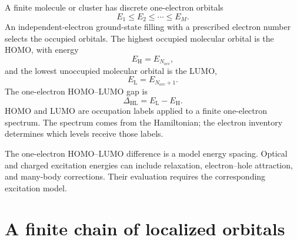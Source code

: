 A finite molecule or cluster has discrete one-electron orbitals
\begin{equation}
  E_1\le E_2\le\cdots\le E_M.
  \label{eq:finite-molecular-orbital-ordering}
\end{equation}
An independent-electron ground-state filling with a prescribed electron number
selects the occupied orbitals.  The highest occupied molecular orbital is the
HOMO, with energy
\begin{equation}
  E_{\mathrm H}=E_{N_{\mathrm{occ}}},
  \label{eq:homo-energy-definition}
\end{equation}
and the lowest unoccupied molecular orbital is the LUMO,
\begin{equation}
  E_{\mathrm L}=E_{N_{\mathrm{occ}}+1}.
  \label{eq:lumo-energy-definition}
\end{equation}
The one-electron HOMO--LUMO gap is
\begin{equation}
  \boxed{
  \Delta_{\mathrm{HL}}=E_{\mathrm L}-E_{\mathrm H}.
  }
  \label{eq:homo-lumo-gap}
\end{equation}
HOMO and LUMO are occupation labels applied to a finite one-electron spectrum.
The spectrum comes from the Hamiltonian; the electron inventory determines
which levels receive those labels.

The one-electron HOMO--LUMO difference is a model energy spacing.  Optical and
charged excitation energies can include relaxation, electron--hole attraction,
and many-body corrections.  Their evaluation requires the corresponding
excitation model.

\section{A finite chain of localized orbitals}


